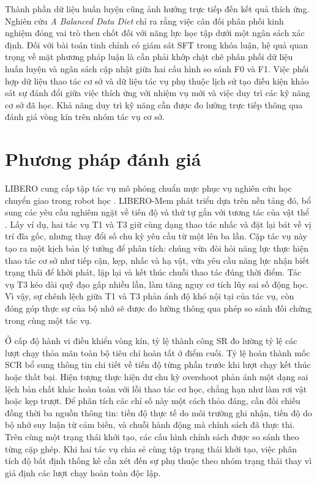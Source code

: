 Thành phần dữ liệu huấn luyện cũng ảnh hưởng trực tiếp đến kết quả thích ứng. Nghiên cứu \textit{A Balanced Data Diet} \cite{balanceddiet2026} chỉ ra rằng việc cân đối phân phối kinh nghiệm đóng vai trò then chốt đối với năng lực học tập dưới một ngân sách xác định. Đối với bài toán tinh chỉnh có giám sát SFT trong khóa luận, hệ quả quan trọng về mặt phương pháp luận là cần phải khớp chặt chẽ phân phối dữ liệu huấn luyện và ngân sách cập nhật giữa hai cấu hình so sánh F0 và F1. Việc phối hợp dữ liệu thao tác cơ sở và dữ liệu tác vụ phụ thuộc lịch sử tạo điều kiện khảo sát sự đánh đổi giữa việc thích ứng với nhiệm vụ mới và việc duy trì các kỹ năng cơ sở đã học. Khả năng duy trì kỹ năng cần được đo lường trực tiếp thông qua đánh giá vòng kín trên nhóm tác vụ cơ sở.

\section{Phương pháp đánh giá}

LIBERO cung cấp tập tác vụ mô phỏng chuẩn mực phục vụ nghiên cứu học chuyển giao trong robot học \cite{libero2023}. LIBERO-Mem phát triển dựa trên nền tảng đó, bổ sung các yêu cầu nghiêm ngặt về tiến độ và thứ tự gắn với tương tác của vật thể \cite{liberomem2025}. Lấy ví dụ, hai tác vụ T1 và T3 giữ cùng dạng thao tác nhấc và đặt lại bát về vị trí đĩa gốc, nhưng thay đổi số chu kỳ yêu cầu từ một lên ba lần. Cặp tác vụ này tạo ra một kịch bản lý tưởng để phân tích: chúng vừa đòi hỏi năng lực thực hiện thao tác cơ sở như tiếp cận, kẹp, nhấc và hạ vật, vừa yêu cầu năng lực nhận biết trạng thái để khởi phát, lặp lại và kết thúc chuỗi thao tác đúng thời điểm. Tác vụ T3 kéo dài quỹ đạo gấp nhiều lần, làm tăng nguy cơ tích lũy sai số động học. Vì vậy, sự chênh lệch giữa T1 và T3 phản ánh độ khó nội tại của tác vụ, còn đóng góp thực sự của bộ nhớ sẽ được đo lường thông qua phép so sánh đối chứng trong cùng một tác vụ.

Ở cấp độ hành vi điều khiển vòng kín, tỷ lệ thành công SR đo lường tỷ lệ các lượt chạy thỏa mãn toàn bộ tiêu chí hoàn tất ở điểm cuối. Tỷ lệ hoàn thành mốc SCR bổ sung thông tin chi tiết về tiến độ từng phần trước khi lượt chạy kết thúc hoặc thất bại. Hiện tượng thực hiện dư chu kỳ overshoot phản ánh một dạng sai lệch bản chất khác hoàn toàn với lỗi thao tác cơ học, chẳng hạn như làm rơi vật hoặc kẹp trượt. Để phân tích các chỉ số này một cách thỏa đáng, cần đối chiếu đồng thời ba nguồn thông tin: tiến độ thực tế do môi trường ghi nhận, tiến độ do bộ nhớ suy luận từ cảm biến, và chuỗi hành động mà chính sách đã thực thi. Trên cùng một trạng thái khởi tạo, các cấu hình chính sách được so sánh theo từng cặp ghép. Khi hai tác vụ chia sẻ cùng tập trạng thái khởi tạo, việc phân tích độ bất định thống kê cần xét đến sự phụ thuộc theo nhóm trạng thái thay vì giả định các lượt chạy hoàn toàn độc lập.

